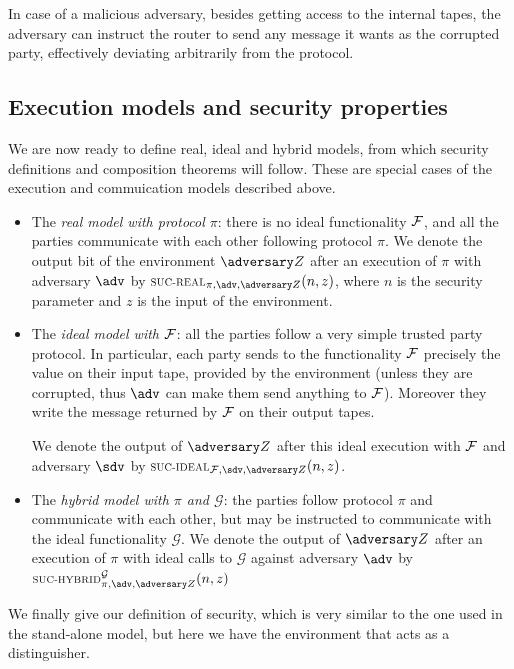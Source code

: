In case of a malicious adversary, besides getting access to the internal tapes, the adversary can instruct the router to send any message it wants as the corrupted party, effectively deviating arbitrarily from the protocol.

\subsection{Execution models and security properties}

We are now ready to define real, ideal and hybrid models, from which security definitions and composition theorems will follow. These are special cases of the execution and commuication models described above.

\begin{itemize}
    \item The \emph{real model with protocol $\pi$}: there is no ideal functionality $\mathcal{F}$, and all the parties communicate with each other following protocol $\pi$. We denote the output bit of the environment $\zdv$ after an execution of $\pi$ with adversary $\adv$ by $\textsc{\scriptsize SUC-REAL}_{\pi,\adv,\zdv}(n,z)$, where $n$ is the security parameter and $z$ is the input of the environment.
    \item The \emph{ideal model with $\mathcal{F}$}: all the parties follow a very simple trusted party protocol. In particular, each party sends to the functionality $\mathcal{F}$ precisely the value on their input tape, provided by the environment (unless they are corrupted, thus $\adv$ can make them send anything to $\mathcal{F}$). Moreover they write the message returned by $\mathcal{F}$ on their output tapes.
    
    We denote the output of $\zdv$ after this ideal execution with $\mathcal{F}$ and adversary $\sdv$ by $\textsc{\scriptsize SUC-IDEAL}_{\Fun,\sdv,\zdv}(n,z)$.
    
    \item The \emph{hybrid model with $\pi$ and $\mathcal G$}: the parties follow protocol $\pi$ and communicate with each other, but may be instructed to communicate with the ideal functionality $\mathcal G$. We denote the output of $\zdv$ after an execution of $\pi$ with ideal calls to $\mathcal G$ against adversary $\adv$ by $\textsc{\scriptsize SUC-HYBRID}^{\mathcal G}_{\pi,\adv,\zdv}(n,z)$
\end{itemize}

We finally give our definition of security, which is very similar to the one used in the stand-alone model, but here we have the environment that acts as a distinguisher.

